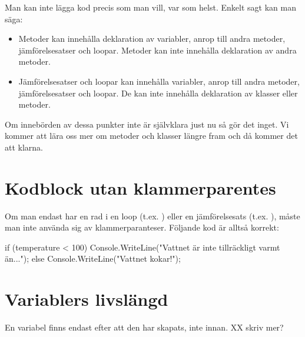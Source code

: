 Man kan inte lägga kod precis som man vill, var som helst. Enkelt sagt kan man säga:
\begin{itemize}
	\item Metoder kan innehålla deklaration av variabler, anrop till andra metoder, jämförelsesatser och loopar. Metoder kan inte innehålla deklaration av andra metoder.
	\item Jämförelsesatser och loopar kan innehålla variabler, anrop till andra metoder, jämförelsesatser och loopar. De kan inte innehålla deklaration av klasser eller metoder.
\end{itemize}

Om innebörden av dessa punkter inte är självklara just nu så gör det inget. Vi kommer att lära oss mer om metoder och klasser längre fram och då kommer det att klarna.

\section{Kodblock utan klammerparentes}
Om man endast har en rad i en loop (t.ex. ) eller en jämförelsesats (t.ex. ), måste man inte använda sig av klammerparanteser. Följande kod är alltså korrekt:

\begin{csharp}[caption={Kodblock utan klammerparentes},label={}]
if (temperature < 100)
    Console.WriteLine("Vattnet är inte tillräckligt varmt än...");
else
    Console.WriteLine("Vattnet kokar!");
\end{csharp}

\section{Variablers livslängd}\label{sec:livslangd}
En variabel finns endast efter att den har skapats, inte innan. XX skriv mer?
